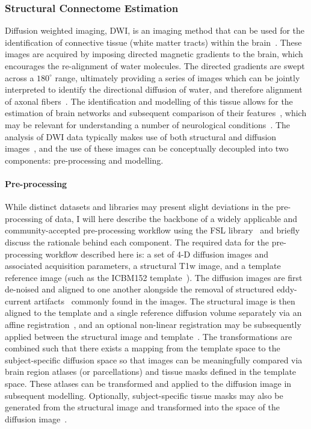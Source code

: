 \subsubsection{Structural Connectome Estimation}

Diffusion weighted imaging, DWI, is an imaging method that can be used for the identification of connective tissue
(white matter tracts) within the brain~\cite{wandell2016clarifying,thomason2011diffusion}. These images are acquired by
imposing directed magnetic gradients to the brain, which encourages the re-alignment of water molecules. The directed
gradients are swept across a $180^{\circ}$ range, ultimately providing a series of images which can be jointly
interpreted to identify the directional diffusion of water, and therefore alignment of axonal
fibers~\cite{pinto2020harmonization}. The identification and modelling of this tissue allows for the estimation of
brain networks and subsequent comparison of their features~\cite{sporns2013human}, which may be relevant for
understanding a number of neurological
conditions~\cite{shah2017altered,yan2018rich,xie2012mapping,griffa2013structural}. The analysis of DWI data typically
makes use of both structural and diffusion images~\cite{jenkinson2012fsl,garyfallidis2014dipy}, and the use of these
images can be conceptually decoupled into two components: pre-processing and modelling.

\paragraph*{Pre-processing}
While distinct datasets and libraries may present slight deviations in the pre-processing of data, I will here describe
the backbone of a widely applicable and community-accepted pre-processing workflow using the FSL
library~\cite{WOOLRICH2009S173,jenkinson2012fsl,Glasser2013-vf} and briefly discuss the rationale behind each
component. The required data for the pre-processing workflow described here is: a set of 4-D diffusion images and
associated acquisition parameters, a structural T1w image, and a template reference image (such as the ICBM152
template~\cite{lancaster2007bias}). The diffusion images are first de-noised and aligned to one another alongside the
removal of structured eddy-current artifacts~\cite{andersson2016integrated} commonly found in the images. The structural
image is then aligned to the template and a single reference diffusion volume separately via an affine
registration~\cite{jenkinson2001global}, and an optional non-linear registration may be subsequently applied between
the structural image and template~\cite{jenkinson2012fsl}. The transformations are combined such that there exists a
mapping from the template space to the subject-specific diffusion space so that images can be meaningfully compared via
brain region atlases (or parcellations) and tissue masks defined in the template space. These atlases can be transformed
and applied to the diffusion image in subsequent modelling. Optionally, subject-specific tissue masks may also be
generated from the structural image and transformed into the space of the diffusion image~\cite{zhang2001segmentation}.


